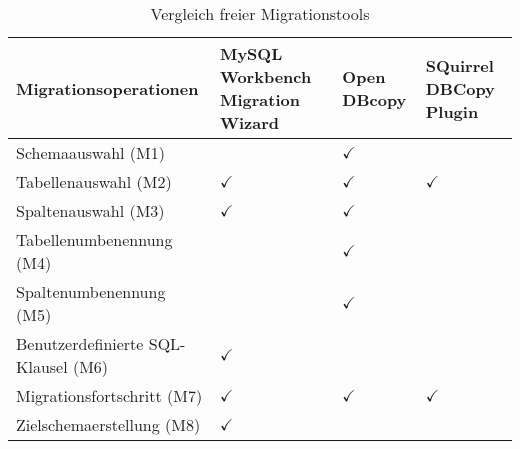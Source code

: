 \begin{table}[h]
	\begin{center}
		\begin{tabular}{ |p{4.5cm}|p{2.5cm}|p{2.5cm}|p{2.5cm}| }
			\hline
			\textbf{Migrationsoperationen} & \textbf{MySQL Workbench Migration Wizard} & \textbf{Open DBcopy} & \textbf{SQuirrel DBCopy Plugin}  \\
			\hline
			Schemaauswahl (M1) &  & $\checkmark$& \\
			\hline
			Tabellenauswahl (M2) & $\checkmark$ & $\checkmark$& $\checkmark$ \\
			\hline
			Spaltenauswahl (M3) & $\checkmark$& $\checkmark$& \\
			\hline
			Tabellenumbenennung (M4)& &$\checkmark$ & \\
			\hline
			Spaltenumbenennung (M5)& & $\checkmark$& \\
			\hline
			Benutzerdefinierte SQL-Klausel (M6)& $\checkmark$& & \\
			\hline
			Migrationsfortschritt (M7)& $\checkmark$& $\checkmark$& $\checkmark$ \\
			\hline
			Zielschemaerstellung (M8)&$\checkmark$ & & \\
			\hline
		\end{tabular}
	\end{center}
	\caption{Vergleich freier Migrationstools}
	\label{table:tools2}
\end{table}
%
%
%


